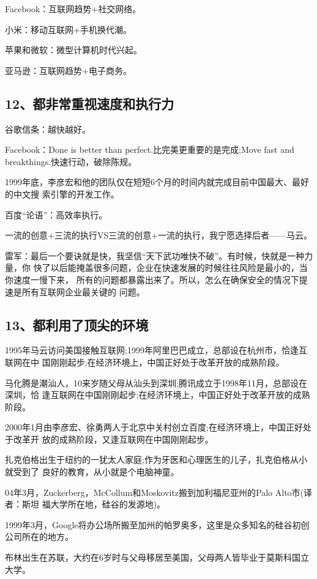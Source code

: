 \documentclass[11pt]{ctexart}
\begin{document}
{{{{Facebook：互联网趋势+社交网络。

小米：移动互联网+手机换代潮。

苹果和微软：微型计算机时代兴起。

亚马逊：互联网趋势+电子商务。

\subsection{12、都非常重视速度和执行力}
\label{sec:org573c354}

谷歌信条：越快越好。

Facebook：Done is better than perfect.比完美更重要的是完成;Move fast and
breakthings.快速行动，破除陈规。

1999年底，李彦宏和他的团队仅在短短6个月的时间内就完成目前中国最大、最好的中文搜
索引擎的开发工作。

百度“论语”：高效率执行。

一流的创意+三流的执行VS三流的创意+一流的执行，我宁愿选择后者——马云。

雷军：最后一个要诀就是快，我坚信“天下武功唯快不破”。有时候，快就是一种力量，你
快了以后能掩盖很多问题，企业在快速发展的时候往往风险是最小的，当你速度一慢下来，
所有的问题都暴露出来了。所以，怎么在确保安全的情况下提速是所有互联网企业最关键的
问题。

\subsection{13、都利用了顶尖的环境}
\label{sec:org44386b8}

1995年马云访问美国接触互联网;1999年阿里巴巴成立，总部设在杭州市，恰逢互联网在中
国刚刚起步;在经济环境上，中国正好处于改革开放的成熟阶段。

马化腾是潮汕人，10来岁随父母从汕头到深圳;腾讯成立于1998年11月，总部设在深圳，恰
逢互联网在中国刚刚起步;在经济环境上，中国正好处于改革开放的成熟阶段。

2000年1月由李彦宏、徐勇两人于北京中关村创立百度;在经济环境上，中国正好处于改革开
放的成熟阶段，又逢互联网在中国刚刚起步。

扎克伯格出生于纽约的一犹太人家庭;作为牙医和心理医生的儿子，扎克伯格从小就受到了
良好的教育，从小就是个电脑神童。

04年3月，Zuckerberg，McCollum和Moskovitz搬到加利福尼亚州的Palo Alto市(译者：斯坦
福大学所在地，硅谷的发源地)。

1999年3月，Google将办公场所搬至加州的帕罗奥多，这里是众多知名的硅谷初创公司所在的地方。

布林出生在苏联，大约在6岁时与父母移居至美国，父母两人皆毕业于莫斯科国立大学。

}}}}
\end{document}
